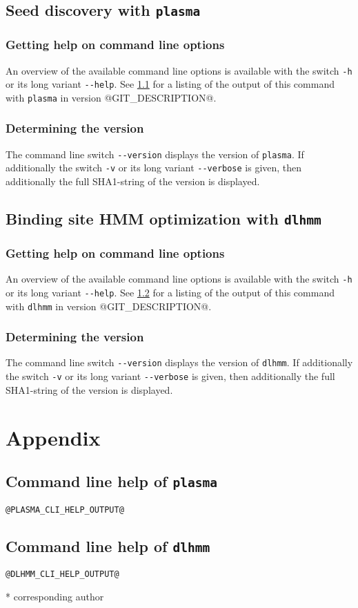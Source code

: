\documentclass[a4paper]{article}
\makeatletter
\newcommand{\plasma}[0]{\texttt{plasma}}
\newcommand{\dlhmm}[0]{\texttt{dlhmm}}
\newcommand{\version}[0]{@GIT_DESCRIPTION@}
\makeatother
\begin{document}
\subsection{Seed discovery with \plasma{}}
\label{subsection:running-plasma}
\subsubsection{Getting help on command line options}
An overview of the available command line options is available with the switch \verb|-h| or its long variant \verb|--help|.
See \cref{appendix:plasma-cli-help} for a listing of the output of this command with \plasma{} in version \version{}.
\subsubsection{Determining the version}
The command line switch \verb|--version| displays the version of \plasma{}.
If additionally the switch \verb|-v| or its long variant \verb|--verbose| is given, then additionally the full SHA1-string of the version is displayed.


\subsection{Binding site HMM optimization with \dlhmm{}}
\label{subsection:running-dlhmm}
\subsubsection{Getting help on command line options}
An overview of the available command line options is available with the switch \verb|-h| or its long variant \verb|--help|.
See \cref{appendix:dlhmm-cli-help} for a listing of the output of this command with \dlhmm{} in version \version{}.

\subsubsection{Determining the version}
The command line switch \verb|--version| displays the version of \dlhmm{}.
If additionally the switch \verb|-v| or its long variant \verb|--verbose| is given, then additionally the full SHA1-string of the version is displayed.


\section{Appendix}
\subsection{Command line help of \plasma{}}
\label{appendix:plasma-cli-help}
\begin{verbatim}
@PLASMA_CLI_HELP_OUTPUT@
\end{verbatim}

\subsection{Command line help of \dlhmm{}}
\label{appendix:dlhmm-cli-help}
\begin{verbatim}
@DLHMM_CLI_HELP_OUTPUT@
\end{verbatim}



\nocite{*}


* corresponding author
\end{document}
